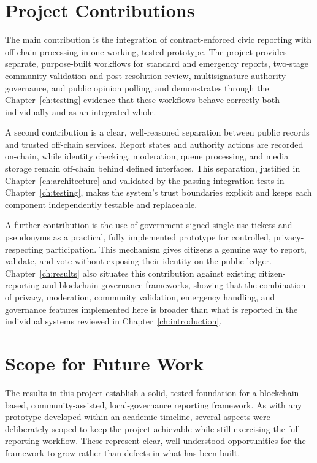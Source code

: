 \section{Project Contributions}
\label{sec:project-contributions}

The main contribution is the integration of contract-enforced civic reporting with off-chain processing in one working, tested prototype. The project provides separate, purpose-built workflows for standard and emergency reports, two-stage community validation and post-resolution review, multisignature authority governance, and public opinion polling, and demonstrates through the Chapter~\ref{ch:testing} evidence that these workflows behave correctly both individually and as an integrated whole.

A second contribution is a clear, well-reasoned separation between public records and trusted off-chain services. Report states and authority actions are recorded on-chain, while identity checking, moderation, queue processing, and media storage remain off-chain behind defined interfaces. This separation, justified in Chapter~\ref{ch:architecture} and validated by the passing integration tests in Chapter~\ref{ch:testing}, makes the system's trust boundaries explicit and keeps each component independently testable and replaceable.

A further contribution is the use of government-signed single-use tickets and pseudonyms as a practical, fully implemented prototype for controlled, privacy-respecting participation. This mechanism gives citizens a genuine way to report, validate, and vote without exposing their identity on the public ledger. Chapter~\ref{ch:results} also situates this contribution against existing citizen-reporting and blockchain-governance frameworks, showing that the combination of privacy, moderation, community validation, emergency handling, and governance features implemented here is broader than what is reported in the individual systems reviewed in Chapter~\ref{ch:introduction}.

\section{Scope for Future Work}
\label{sec:conclusion-limitations}

The results in this project establish a solid, tested foundation for a blockchain-based, community-assisted, local-governance reporting framework. As with any prototype developed within an academic timeline, several aspects were deliberately scoped to keep the project achievable while still exercising the full reporting workflow. These represent clear, well-understood opportunities for the framework to grow rather than defects in what has been built.

